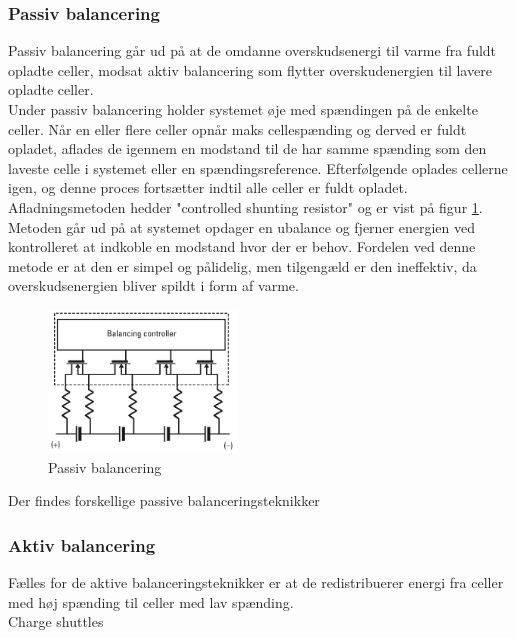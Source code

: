 \subsubsection{Passiv balancering}
Passiv balancering går ud på at de omdanne overskudsenergi til varme fra fuldt opladte celler, modsat aktiv balancering som flytter overskudenergien til lavere opladte celler.
\\

Under passiv balancering holder systemet øje med spændingen på de enkelte celler. Når en eller flere celler opnår maks cellespænding og derved er fuldt opladet, aflades de igennem en modstand til de har samme spænding som den laveste celle i systemet eller en spændingsreference. Efterfølgende oplades cellerne igen, og denne proces fortsætter indtil alle celler er fuldt opladet. Afladningsmetoden hedder "controlled shunting resistor" og er vist på figur \ref{fig:passiv_balancering}. Metoden går ud på at systemet opdager en ubalance og fjerner energien ved kontrolleret at indkoble en modstand hvor der er behov. Fordelen ved denne metode er at den er simpel og pålidelig, men tilgengæld er den ineffektiv, da overskudsenergien bliver spildt i form af varme. 

\begin{figure}[h]
	\centering
	\includegraphics[width=5cm]{billeder/passiv_balancering.png}
	\caption{Passiv balancering}
	\label{fig:passiv_balancering}
\end{figure}

Der findes forskellige passive balanceringsteknikker 
\subsubsection{Aktiv balancering}
Fælles for de aktive balanceringsteknikker er at de redistribuerer energi fra celler med høj spænding til celler med lav spænding.
\\

Charge shuttles

